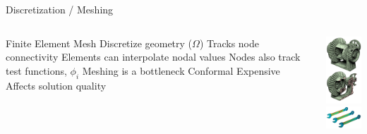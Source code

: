 \placelogofalse
\begin{frame}{Discretization / Meshing}
\begin{columns}
\centering
\begin{outline}
  \1 Finite Element Mesh
  \2 Discretize geometry ($\Omega$)
  \2 Tracks node connectivity
  \1 Elements can interpolate nodal values 
  \1 Nodes also track test functions, $\phi_i$
  \1 Meshing is a bottleneck
  \2 Conformal
  \2 Expensive
  \2 Affects solution quality
\end{outline}

\begin{center}
\includegraphics[width=2.5cm]{mesh_example_01.png}\\

\includegraphics[width=4.0cm]{mesh_example_02.png}\\
\end{center}
\end{columns}
\end{frame}
\placelogotrue


